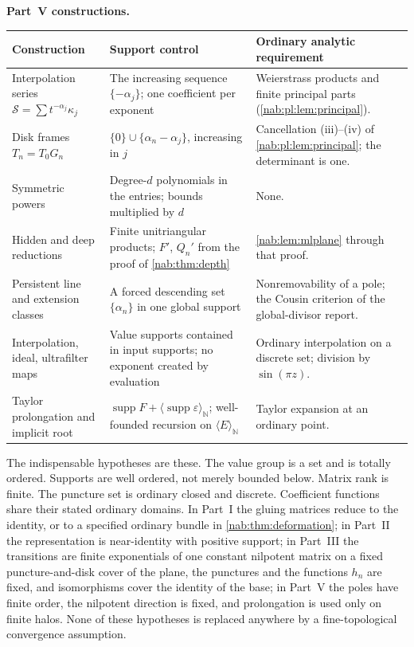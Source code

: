 \documentclass[11pt,letterpaper]{article}
\theoremstyle{definition}
\theoremstyle{remark}
\newcommand{\N}{\mathbb N}
\newcommand{\supp}{\operatorname{supp}}
\newcommand{\angles}[1]{\langle #1\rangle_{\N}}
\numberwithin{equation}{section}
\begin{document}
\medskip\noindent\textbf{Part~V constructions.}
\begin{center}\small
\begin{tabular}{@{}L{0.26\textwidth}L{0.35\textwidth}L{0.29\textwidth}@{}}
\toprule
Construction & Support control & Ordinary analytic requirement\\
\midrule
Interpolation series $\mathcal S=\sum t^{-\alpha_j}\kappa_j$ &
The increasing sequence $\{-\alpha_j\}$; one coefficient per exponent &
Weierstrass products and finite principal parts
(\cref{nab:pl:lem:principal}).\\ \addlinespace[0.35em]
Disk frames $T_n=T_0G_n$ &
$\{0\}\cup\{\alpha_n-\alpha_j\}$, increasing in $j$ &
Cancellation (iii)--(iv) of \cref{nab:pl:lem:principal}; the determinant is
one.\\ \addlinespace[0.35em]
Symmetric powers &
Degree-$d$ polynomials in the entries; bounds multiplied by $d$ &
None.\\ \addlinespace[0.35em]
Hidden and deep reductions &
Finite unitriangular products; $F'$, $Q_n'$ from the proof of
\cref{nab:thm:depth} &
\cref{nab:lem:mlplane} through that proof.\\ \addlinespace[0.35em]
Persistent line and extension classes &
A forced descending set $\{\alpha_n\}$ in one global support &
Nonremovability of a pole; the Cousin criterion of the global-divisor
report.\\ \addlinespace[0.35em]
Interpolation, ideal, ultrafilter maps &
Value supports contained in input supports; no exponent created by evaluation &
Ordinary interpolation on a discrete set; division by
$\sin(\pi z)$.\\ \addlinespace[0.35em]
Taylor prolongation and implicit root &
$\supp F+\angles{\supp\varepsilon}$; well-founded recursion on $\angles E$ &
Taylor expansion at an ordinary point.\\
\bottomrule
\end{tabular}
\end{center}

The indispensable hypotheses are these. The value group is a set and is
totally ordered. Supports are well ordered, not merely bounded below. Matrix
rank is finite. The puncture set is ordinary closed and discrete. Coefficient
functions share their stated ordinary domains. In Part~I the gluing matrices
reduce to the identity, or to a specified ordinary bundle in
\cref{nab:thm:deformation}; in Part~II the representation is near-identity with
positive support; in Part~III the transitions are finite exponentials of one
constant nilpotent matrix on a fixed puncture-and-disk cover of the plane, the
punctures and the functions $h_n$ are fixed, and isomorphisms cover the
identity of the base; in Part~V the poles have finite order, the nilpotent
direction is fixed, and prolongation is used only on finite halos. None of these hypotheses is replaced anywhere by a
fine-topological convergence assumption.
\end{document}
